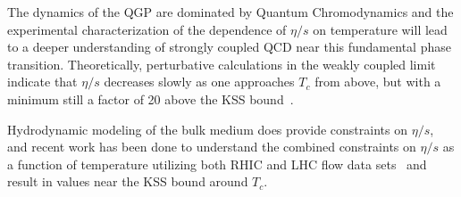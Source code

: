 The dynamics of the QGP are dominated by Quantum Chromodynamics and the
experimental characterization of the dependence of $\eta/s$ on
temperature will lead to a deeper understanding of strongly coupled
QCD near this fundamental phase transition.  Theoretically,
perturbative calculations in the weakly coupled limit indicate that
$\eta/s$ decreases slowly as one approaches $T_{c}$ from above, but
with a minimum still a factor of 20 above the KSS
bound~\cite{Arnold:2003zc}.



Hydrodynamic modeling of the bulk medium does provide constraints on
$\eta/s$, and recent work has been done to understand the combined
constraints on $\eta/s$ as a function of temperature utilizing both
RHIC and LHC flow data sets~\cite{Gale:2012rq,Song:2011qa,Nagle:2011uz,Niemi:2011ix} and result
in values near the KSS bound around $T_c$.  


